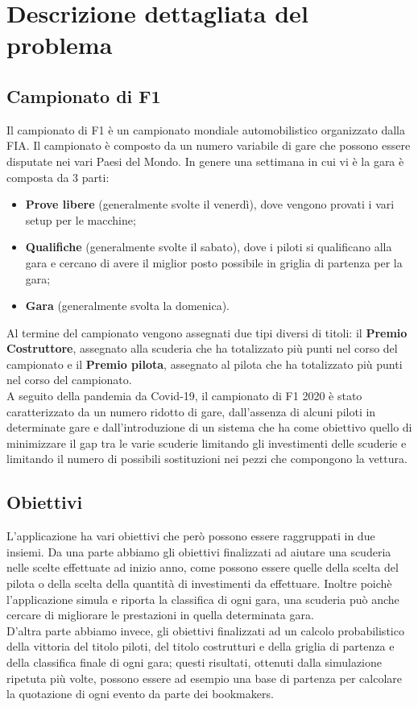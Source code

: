 \chapter{Descrizione dettagliata del problema}
\label{sec:descrizione dettagliata del problema}


\section[Campionato di F1]{Campionato di F1} %
Il campionato di F1 è un campionato mondiale automobilistico organizzato dalla FIA. Il campionato è composto da un numero variabile di gare che possono essere disputate nei vari Paesi del Mondo. In genere una settimana in cui vi è la gara è composta da 3 parti: 
\begin{itemize}
\item \textbf{Prove libere} (generalmente svolte il venerdì), dove vengono provati i vari setup per le macchine;
\item \textbf{Qualifiche} (generalmente svolte il sabato), dove i piloti si qualificano alla gara e cercano di avere il miglior posto possibile in griglia di partenza per la gara;
\item \textbf{Gara} (generalmente svolta la domenica).
\end{itemize}
Al termine del campionato vengono assegnati due tipi diversi di titoli: il \textbf{Premio Costruttore}, assegnato alla scuderia che ha totalizzato più punti nel corso del campionato e il  \textbf{Premio pilota}, assegnato al pilota che ha totalizzato più punti nel corso del campionato.\\
A seguito della pandemia da Covid-19, il campionato di F1 2020 è stato caratterizzato da un numero ridotto di gare, dall'assenza di alcuni piloti in determinate gare e dall'introduzione di un sistema che ha come obiettivo quello di minimizzare il gap tra le varie scuderie limitando gli investimenti delle scuderie e limitando il numero di possibili sostituzioni nei pezzi che compongono la vettura.

\section[Obiettivi]{Obiettivi} %
L'applicazione ha vari obiettivi che però possono essere raggruppati in due insiemi. Da una parte abbiamo gli obiettivi finalizzati ad aiutare una scuderia nelle scelte effettuate ad inizio anno, come possono essere quelle della scelta del pilota o della scelta della quantità di investimenti da effettuare. Inoltre poichè l'applicazione simula e riporta la classifica di  ogni gara, una scuderia può anche cercare di migliorare le prestazioni in quella determinata gara.\\ D'altra parte abbiamo invece, gli obiettivi finalizzati ad un calcolo probabilistico della vittoria del titolo piloti, del titolo costrutturi e della griglia di partenza e della classifica finale di ogni gara; questi risultati, ottenuti dalla simulazione ripetuta più volte, possono essere ad esempio una base di partenza per calcolare la quotazione di ogni evento da parte dei bookmakers.
